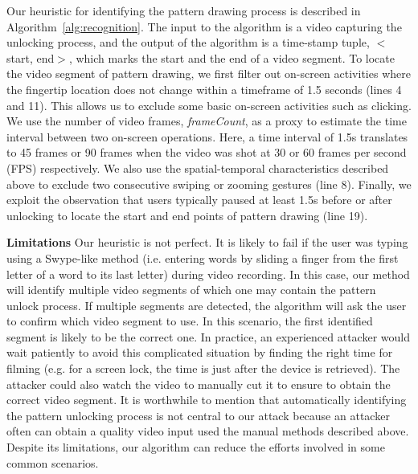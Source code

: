 Our heuristic for identifying the pattern drawing process is described
in Algorithm~\ref{alg:recognition}. The input to the algorithm is a video capturing the unlocking process, and the output of the
algorithm is a time-stamp tuple, $<$start, end$>$, which marks the start and the end
of a video segment.
To locate the video segment of pattern drawing, we first filter out on-screen activities where the
fingertip location does not change within a timeframe of 1.5 seconds (lines 4 and 11). This
allows us to exclude some basic on-screen activities such as clicking. We
use the number of video frames, \emph{frameCount}, as a proxy to estimate the time interval between two on-screen operations. Here, a time
interval of 1.5s translates to 45 frames or 90 frames when the video was shot
at 30 or 60 frames per second (FPS) respectively. We also use the
spatial-temporal characteristics described above to exclude two consecutive swiping or zooming gestures (line 8). Finally, we exploit the observation that users
typically paused at least 1.5s before or after unlocking to locate the start
and end points of pattern drawing (line 19).

\noindent \textbf{Limitations} Our heuristic is not perfect. It is likely to fail if the user was typing
using a Swype-like method (i.e. entering words by sliding a finger from
the first letter of a word to its last letter) during video recording. In
this case, our method will identify multiple video segments of which one may contain
the pattern unlock process. If multiple segments are detected, the algorithm will ask the
user to confirm which video segment to use.
In this scenario, the first identified segment is likely to be the correct one.
In practice, an experienced attacker would wait patiently to avoid this
complicated situation by finding the right time for filming (e.g. for a screen
lock, the time is just after the device is retrieved).
The attacker could also watch the video to manually cut it to ensure to obtain the correct video segment.
It is
worthwhile to mention that automatically identifying the pattern unlocking process is
not central to our attack because an attacker often can obtain a quality video input used the manual methods described above.
Despite its limitations, our algorithm can reduce the efforts involved in some common scenarios.

